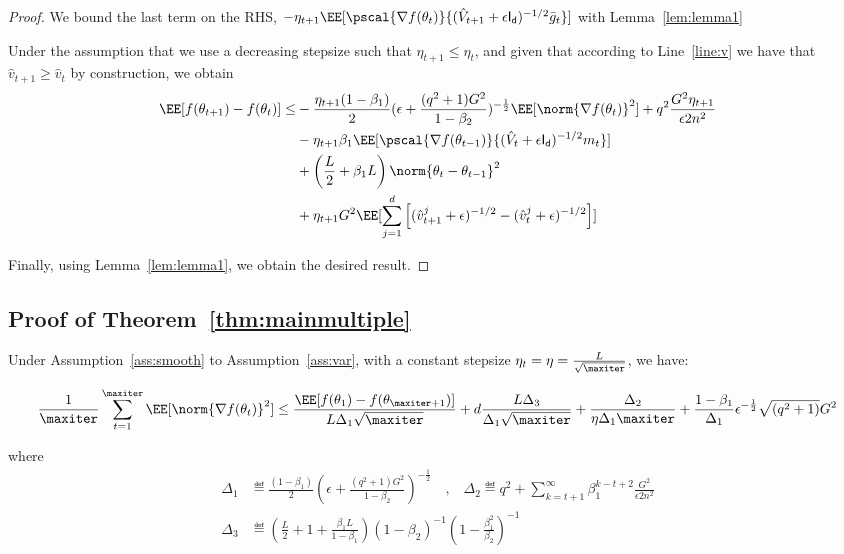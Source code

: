 \documentclass[11pt]{article}
\begin{document}
\begin{proof}
We bound the last term on the RHS, $ -\eta_{t+1} \EE[\pscal{\nabla f(\theta_t)}{(\hat{V}_{t+1} + \epsilon \mathsf{I_d})^{-1/2} \bar{g}_t}]$ with Lemma~\ref{lem:lemma1}

Under the assumption that we use a decreasing stepsize such that $\eta_{t+1} \leq \eta_{t}$, and given that according to Line~\ref{line:v} we have that $\hat v_{t+1} \geq \hat v_{t}$ by construction, we obtain 
\begin{equation}
\begin{split}
\EE[f(\theta_{t+1}) - f(\theta_{t}) ] \leq &   - \frac{\eta_{t+1}(1-\beta_1)}{2}  (\epsilon + \frac{(q^2+1)G^2}{1 - \beta_2})^{-\frac{1}{2}} \EE[\norm{\nabla f(\theta_t)}^2] +q^2 \frac{G^2 \eta_{t+1}}{\epsilon 2n^2} \\
&- \eta_{t+1} \beta_1\EE[\pscal{\nabla f(\theta_{t-1})}{(\hat{V}_{t} + \epsilon \mathsf{I_d})^{-1/2} m_{t}}]\\
& +  \left(\frac{L}{2} + \beta_1 L \right) \norm{\theta_t - \theta_{t-1}}^2\\
&+   \eta_{t+1} G^2 \EE[\sum_{j=1}^d \left[(\hat{v}^j_{t+1} + \epsilon )^{-1/2} - (\hat{v}^j_{t} + \epsilon )^{-1/2}  \right] ]
\end{split}
\end{equation}

Finally, using Lemma~\ref{lem:lemma1}, we obtain the desired result.
\end{proof}



\subsection{Proof of Theorem~\ref{thm:mainmultiple}}


\begin{Theorem*}
Under Assumption~\ref{ass:smooth} to Assumption~\ref{ass:var}, with a constant stepsize $\eta_t = \eta = \frac{L}{\sqrt{\maxiter}}$, we have:

\begin{equation}
\begin{split}
 \frac{1}{\maxiter}\sum_{t=1}^{\maxiter} \EE[\norm{\nabla f(\theta_t)}^2] \leq \frac{\EE[ f(\theta_{1}) - f(\theta_{\maxiter+1})]}{L \Delta_1 \sqrt{\maxiter}} + 
d\frac{L \Delta_3}{\Delta_1 \sqrt{\maxiter}}  + \frac{\Delta_2}{\eta \Delta_1\maxiter} +\frac{1-\beta_1}{\Delta_1}  \epsilon^{-\frac{1}{2}} \sqrt{(q^2+1)}G^2 
\end{split}
\end{equation}

where 
\begin{equation}
\begin{split}
\Delta_1 & \eqdef \frac{(1-\beta_1)}{2} (\epsilon + \frac{(q^2+1)G^2}{1 - \beta_2})^{-\frac{1}{2}} \quad \textrm{,} \quad \Delta_2 \eqdef q^2 + \sum_{k=t+1}^\infty  \beta_1^{k-t+2}\frac{G^2 }{\epsilon 2n^2}\\
\Delta_3 &\eqdef \left(\frac{L}{2} + 1+ \frac{\beta_1L}{1-\beta_1} \right) (1-\beta_2)^{-1} (1 - \frac{\beta_1^{2}}{\beta_2})^{-1}
\end{split}
\end{equation}
\end{Theorem*}
\end{document}
